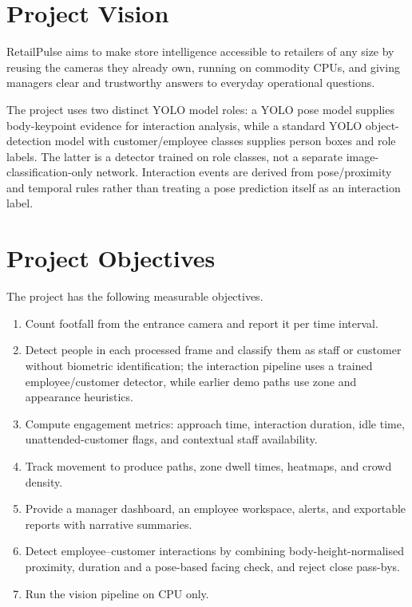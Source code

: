 \section{Project Vision}
RetailPulse aims to make store intelligence accessible to retailers of any size by reusing the cameras they already own, running on commodity CPUs, and giving managers clear and trustworthy answers to everyday operational questions.

The project uses two distinct YOLO model roles: a YOLO pose model supplies body-keypoint evidence for interaction analysis, while a standard YOLO object-detection model with customer/employee classes supplies person boxes and role labels. The latter is a detector trained on role classes, not a separate image-classification-only network. Interaction events are derived from pose/proximity and temporal rules rather than treating a pose prediction itself as an interaction label.

\section{Project Objectives}
The project has the following measurable objectives.
\begin{enumerate}[label=O\arabic*.]
\item Count footfall from the entrance camera and report it per time interval.
\item Detect people in each processed frame and classify them as staff or customer without biometric identification; the interaction pipeline uses a trained employee/customer detector, while earlier demo paths use zone and appearance heuristics.
\item Compute engagement metrics: approach time, interaction duration, idle time, unattended-customer flags, and contextual staff availability.
\item Track movement to produce paths, zone dwell times, heatmaps, and crowd density.
\item Provide a manager dashboard, an employee workspace, alerts, and exportable reports with narrative summaries.
\item Detect employee--customer interactions by combining body-height-normalised proximity, duration and a pose-based facing check, and reject close pass-bys.
\item Run the vision pipeline on CPU only.
\end{enumerate}

